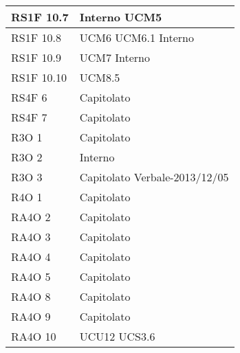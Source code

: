 \begin{center}
\begin{longtable}{ | p{5cm} | p{5cm} |}
        RS1F 10.7 &  Interno \newline  UCM5 \newline  \\ \hline      
        RS1F 10.8 &  UCM6 \newline  UCM6.1 \newline  Interno \newline  \\ \hline      
        RS1F 10.9 &  UCM7 \newline  Interno \newline  \\ \hline      
        RS1F 10.10 &  UCM8.5 \newline  \\ \hline      
        RS4F 6 &  Capitolato \newline  \\ \hline      
        RS4F 7 &  Capitolato \newline  \\ \hline      
        R3O 1 &  Capitolato \newline  \\ \hline      
        R3O 2 &  Interno \newline  \\ \hline      
        R3O 3 &  Capitolato \newline  Verbale-2013/12/05 \newline  \\ \hline      
        R4O 1 &  Capitolato \newline  \\ \hline      
        RA4O 2 &  Capitolato \newline  \\ \hline      
        RA4O 3 &  Capitolato \newline  \\ \hline      
        RA4O 4 &  Capitolato \newline  \\ \hline      
        RA4O 5 &  Capitolato \newline  \\ \hline      
        RA4O 8 &  Capitolato \newline  \\ \hline      
        RA4O 9 &  Capitolato \newline  \\ \hline      
        RA4O 10 &  UCU12 \newline  UCS3.6 \newline  \\ \hline     
      \end{longtable}
      \egroup
      \end{center}  
\clearpage


